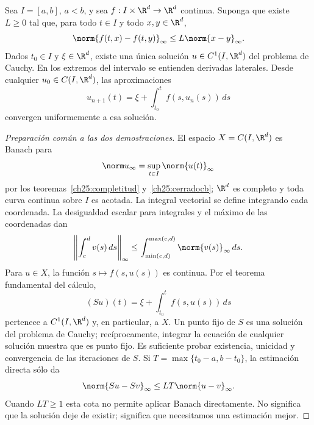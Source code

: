 \begin{teorema}\label{ampl:picard-teorema}
Sea $I=[a,b]$, $a<b$, y sea $f:I\times\R^d\to\R^d$ continua. Suponga que existe $L\ge0$ tal que, para todo $t\in I$ y todo $x,y\in\R^d$,
\[
 \norm{f(t,x)-f(t,y)}_\infty\le L\norm{x-y}_\infty.
\]
Dados $t_0\in I$ y $\xi\in\R^d$, existe una única solución $u\in C^1(I,\R^d)$ del problema de Cauchy. En los extremos del intervalo se entienden derivadas laterales. Desde cualquier $u_0\in C(I,\R^d)$, las aproximaciones
\[
 u_{n+1}(t)=\xi+\int_{t_0}^t f(s,u_n(s))\,ds
\]
convergen uniformemente a esa solución.
\end{teorema}

\begin{proof}[Preparación común a las dos demostraciones]
El espacio $X=C(I,\R^d)$ es Banach para
\[
 \norm u_\infty=\sup_{t\in I}\norm{u(t)}_\infty
\]
por los teoremas~\ref{ch25:completitud} y~\ref{ch25:cerradocb}; $\R^d$ es completo y toda curva continua sobre $I$ es acotada. La integral vectorial se define integrando cada coordenada. La desigualdad escalar para integrales y el máximo de las coordenadas dan
\[
 \left\|\int_c^d v(s)\,ds\right\|_\infty
 \le\int_{\min(c,d)}^{\max(c,d)}\norm{v(s)}_\infty\,ds.
\]
Para $u\in X$, la función $s\mapsto f(s,u(s))$ es continua. Por el teorema fundamental del cálculo,
\[
 (Su)(t)=\xi+\int_{t_0}^t f(s,u(s))\,ds
\]
pertenece a $C^1(I,\R^d)$ y, en particular, a $X$. Un punto fijo de $S$ es una solución del problema de Cauchy; recíprocamente, integrar la ecuación de cualquier solución muestra que es punto fijo. Es suficiente probar existencia, unicidad y convergencia de las iteraciones de $S$. Si $T=\max\{t_0-a,b-t_0\}$, la estimación directa sólo da
\[
 \norm{Su-Sv}_\infty\le LT\norm{u-v}_\infty.
\]
Cuando $LT\ge1$ esta cota no permite aplicar Banach directamente. No significa que la solución deje de existir; significa que necesitamos una estimación mejor.
\end{proof}

